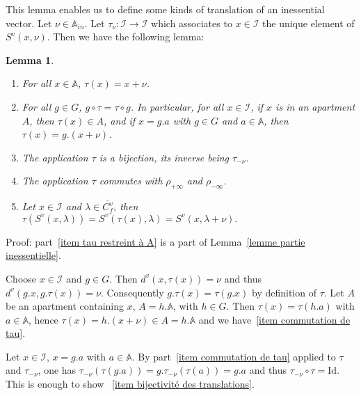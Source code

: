 \documentclass[12pt]{article}
\theoremstyle{plain}
\newtheorem{lemme}[thm]{Lemma}
\theoremstyle{definition}
\newcommand{\A}{\mathbb{A}}
\newcommand{\I}{\mathcal{I}}
\newcommand{\Id}{\mathrm{Id}}
\begin{document}
This lemma enables us to define some kinds of translation of an inessential vector. Let $\nu\in \A_{in}$. Let $\tau_\nu:\I\rightarrow \I$ which associates to $x\in \I$ the unique element of $S^v(x,\nu)$. Then we have the following lemma: 

\begin{lemme}\label{lemme propriétés des translations}
\begin{enumerate}
Let $\nu\in \A_{in}$ and $\tau=\tau_\nu$. Then:

\item For all $x\in \A$, $\tau(x)=x+\nu$.\label{item tau restreint à A}

\item For all $g\in G$, $g\circ\tau=\tau\circ g$. In particular, for all $x\in \I$, if $x$ is in an apartment $A$,
 then $\tau(x)\in A$, and if $x=g.a$ with $g\in G$ and $a\in\A$, then $\tau(x)=g.(x+\nu)$.\label{item commutation de tau}

\item The application $\tau$ is a bijection, its inverse being $\tau_{-\nu}$.\label{item bijectivité des translations}


\item The application $\tau$ commutes with $\rho_{+\infty}$ and $\rho_{-\infty}.$\label{item commutation translation retraction}

\item Let $x\in \I$ and $\lambda\in \overline{C_f^v}$, then $\tau(S^v(x,\lambda))=S^v(\tau(x),\lambda)=S^v(x,\lambda+\nu).$\label{item translation d'une boule}

\end{enumerate}
\end{lemme}

Proof: part~\ref{item tau restreint à A} is a part of Lemma~\ref{lemme partie inessentielle}.


Choose $x\in \I$ and $g\in G$. Then $d^v(x,\tau(x))=\nu$ and thus $d^v(g.x,g.\tau(x))=\nu$. Consequently $g.\tau(x)=\tau(g.x)$ by definition of $\tau$. Let $A$ be an apartment containing $x$, $A=h.\A$, with $h\in G$. Then $\tau(x)=\tau(h.a)$ with $a\in \A$, hence $\tau(x)=h.(x+\nu)\in A=h.\A$ and we have~\ref{item commutation de tau}.

Let $x\in\I$, $x=g.a$ with $a\in \A$. By part~\ref{item commutation de tau} applied to $\tau$ and $\tau_{-\nu}$, one has $\tau_{-\nu}(\tau(g.a))=g.\tau_{-\nu}(\tau(a))=g.a$ and thus $\tau_{-\nu}\circ\tau=\Id$. This is enough to show ~\ref{item bijectivité des translations}.
\end{document}
